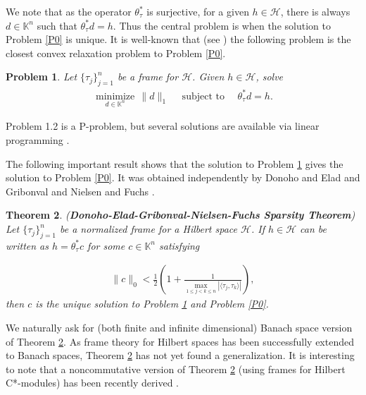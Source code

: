 \documentclass{amsart}
\newtheorem{theorem}{Theorem}[section]
\newtheorem{problem}[theorem]{Problem}
\begin{document}
We  note that as the operator $\theta_\tau^*$ is surjective, for a given $h \in \mathcal{H}$, there is always $d\in \mathbb{K}^n$ such that  $\theta_\tau^*d=h.$ Thus the central problem is when the solution to Problem \ref{P0} is unique.   It is well-known that (see \cite{CHENDONOHOSAUNDERS, DONOHOHUO, BRUCKSTEINDONOHOELAD}) the  following problem is the closest convex relaxation problem to Problem \ref{P0}.
\begin{problem} \label{P1}
Let $\{\tau_j\}_{j=1}^n$ be a frame for  $\mathcal{H}$.	Given $h \in \mathcal{H}$, solve 	
	\begin{align*}
		\underset{d\in \mathbb{K}^n}{\operatorname{minimize}}\,\|d\|_1 \quad \text{ subject to } \quad \theta_\tau^*d=h.
	\end{align*}
\end{problem}
Problem 1.2 is a P-problem, but several solutions are available via linear programming \cite{XUEYE, TERLAKY, TILLMANN}.

The following important result shows that the solution to
Problem \ref{P1} gives the solution to Problem \ref{P0}. It was obtained independently by Donoho and Elad \cite{DONOHOELAD} and Gribonval and Nielsen \cite{GRIBONVALNIELSEN} and Fuchs \cite{FUCHS, FUCHS2}.
\begin{theorem}\cite{DONOHOELAD, GRIBONVALNIELSEN, ELAD, KUTYNIOK, FUCHS, FUCHS2}\label{DEGN} (\textbf{Donoho-Elad-Gribonval-Nielsen-Fuchs Sparsity Theorem})
	Let $\{\tau_j\}_{j=1}^n$ be a  normalized frame  for  a Hilbert space $\mathcal{H}$. If  
 $h \in \mathcal{H}$ can be written as  $	h=\theta_\tau^*c$ for some  $c\in \mathbb{K}^n$ satisfying 
 
 \begin{align*}
 \|c\|_0<\frac{1}{2}\left(1+\frac{1}{\displaystyle\max_{1\leq j< k \leq n}|\langle \tau_j, \tau_k\rangle|}\right),
 \end{align*}
 then $c$ is the unique solution to Problem \ref{P1} and Problem \ref{P0}.
\end{theorem}
We naturally ask for (both finite and infinite dimensional)  Banach space version  of Theorem \ref{DEGN}.  As frame theory for Hilbert spaces has been successfully extended to Banach spaces, Theorem  \ref{DEGN} has not yet found a generalization. It is interesting to note that a noncommutative version of Theorem \ref{DEGN} (using frames for Hilbert C*-modules) has been recently derived \cite{KRISHNA}.
\end{document}
